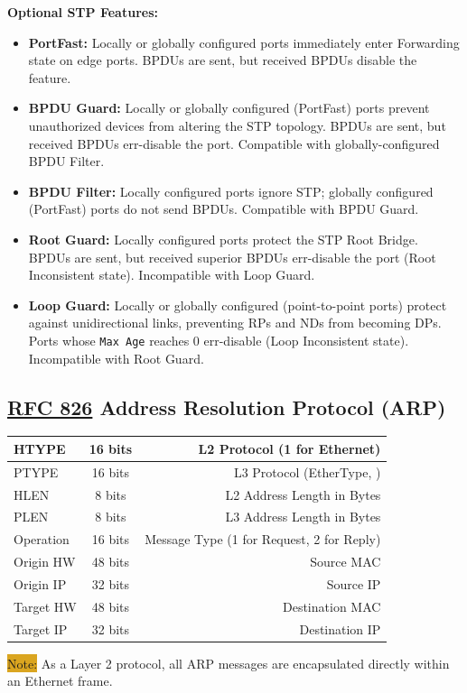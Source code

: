 \documentclass[12pt]{article}
\newcommand{\note}[1]{\colorbox{#1}{Note:}}
\newcommand{\RFC}[1]{\href{https://datatracker.ietf.org/doc/html/rfc#1}{RFC #1}}
\begin{document}
	\textbf{Optional STP Features:}
	\begin{itemize}
		\label{itm:STP FEATURES}
		\item{\textbf{PortFast:} Locally or globally configured ports immediately enter Forwarding state on edge ports. BPDUs are sent, but received BPDUs disable the feature.}
		\item{\textbf{BPDU Guard:} Locally or globally configured (PortFast) ports prevent unauthorized devices from altering the STP topology. BPDUs are sent, but received BPDUs err-disable the port. Compatible with globally-configured BPDU Filter.}
		\item{\textbf{BPDU Filter:} Locally configured ports ignore STP; globally configured (PortFast) ports do not send BPDUs. Compatible with BPDU Guard.}
		\item{\textbf{Root Guard:} Locally configured ports protect the STP Root Bridge. BPDUs are sent, but received superior BPDUs err-disable the port (Root Inconsistent state). Incompatible with Loop Guard.}
		\item{\textbf{Loop Guard:} Locally or globally configured (point-to-point ports) protect against unidirectional links, preventing RPs and NDs from becoming DPs. Ports whose \texttt{Max Age} reaches 0 err-disable (Loop Inconsistent state). Incompatible with Root Guard.}
	\end{itemize}


	\subsection[RFC 826 ARP]{\RFC{826} Address Resolution Protocol (ARP) \label{subsec:ARP}}
	\begin{table}[H]
	\centering
	\begin{tabular}{| l | c | r |}
	\hline
	HTYPE	& 16 bits	& L2 Protocol (1 for Ethernet)\\\hline
	PTYPE	& 16 bits	& L3 Protocol (EtherType, \Cref{tab:ETHERTYPE})\\\hline
	HLEN		& 8 bits	& L2 Address Length in Bytes\\\hline
	PLEN		& 8 bits	& L3 Address Length in Bytes\\\hline
	Operation	& 16 bits	& Message Type (1 for Request, 2 for Reply)\\\hline
	Origin HW 	& 48 bits	& Source MAC\\\hline
	Origin IP	& 32 bits	& Source IP\\\hline
	Target HW 	& 48 bits	& Destination MAC\\\hline
	Target IP	& 32 bits	& Destination IP\\\hline
	\end{tabular}\end{table}
	\note{Goldenrod} As a Layer 2 protocol, all ARP messages are encapsulated directly within an Ethernet frame.
\end{document}
